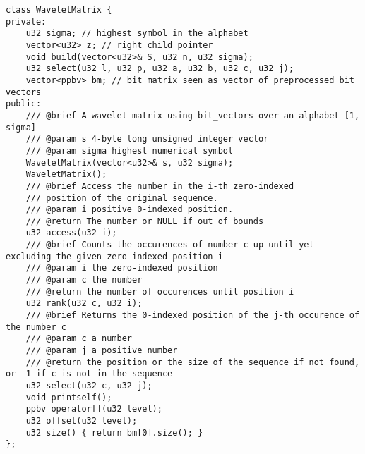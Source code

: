 \begin{lstlisting}[style=cppstyle, caption={Matriz \textit{Wavelet}}, label={lst:wlmt}]
class WaveletMatrix {
private:    
    u32 sigma; // highest symbol in the alphabet
    vector<u32> z; // right child pointer
    void build(vector<u32>& S, u32 n, u32 sigma);
    u32 select(u32 l, u32 p, u32 a, u32 b, u32 c, u32 j);
    vector<ppbv> bm; // bit matrix seen as vector of preprocessed bit vectors
public:    
    /// @brief A wavelet matrix using bit_vectors over an alphabet [1, sigma]
    /// @param s 4-byte long unsigned integer vector
    /// @param sigma highest numerical symbol
    WaveletMatrix(vector<u32>& s, u32 sigma);
    WaveletMatrix();
    /// @brief Access the number in the i-th zero-indexed 
    /// position of the original sequence.
    /// @param i positive 0-indexed position.
    /// @return The number or NULL if out of bounds
    u32 access(u32 i);
    /// @brief Counts the occurences of number c up until yet excluding the given zero-indexed position i
    /// @param i the zero-indexed position
    /// @param c the number
    /// @return the number of occurences until position i
    u32 rank(u32 c, u32 i);
    /// @brief Returns the 0-indexed position of the j-th occurence of the number c
    /// @param c a number
    /// @param j a positive number    
    /// @return the position or the size of the sequence if not found, or -1 if c is not in the sequence
    u32 select(u32 c, u32 j);
    void printself();
    ppbv operator[](u32 level);
    u32 offset(u32 level);
    u32 size() { return bm[0].size(); }
};
\end{lstlisting}

